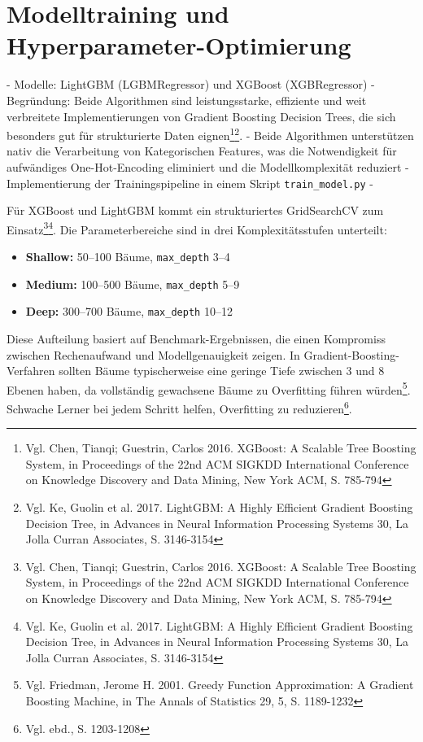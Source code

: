 \section{Modelltraining und Hyperparameter-Optimierung}

- Modelle: LightGBM (LGBMRegressor) und XGBoost (XGBRegressor)
- Begründung: Beide Algorithmen sind leistungsstarke, effiziente und weit verbreitete Implementierungen von Gradient Boosting Decision Trees, die sich besonders gut für strukturierte Daten eignen\footnote{Vgl. Chen, Tianqi; Guestrin, Carlos 2016. XGBoost: A Scalable Tree Boosting System, in Proceedings of the 22nd ACM SIGKDD International Conference on Knowledge Discovery and Data Mining, New York ACM, S. 785-794}\footnote{Vgl. Ke, Guolin et al. 2017. LightGBM: A Highly Efficient Gradient Boosting Decision Tree, in Advances in Neural Information Processing Systems 30, La Jolla Curran Associates, S. 3146-3154}.
- Beide Algorithmen unterstützen nativ die Verarbeitung von Kategorischen Features, was die Notwendigkeit für aufwändiges One-Hot-Encoding eliminiert und die Modellkomplexität reduziert
- Implementierung der Trainingspipeline in einem Skript \texttt{train\_model.py}
- 


Für XGBoost und LightGBM kommt ein strukturiertes GridSearchCV zum Einsatz\footnote{Vgl. Chen, Tianqi; Guestrin, Carlos 2016. XGBoost: A Scalable Tree Boosting System, in Proceedings of the 22nd ACM SIGKDD International Conference on Knowledge Discovery and Data Mining, New York ACM, S. 785-794}\footnote{Vgl. Ke, Guolin et al. 2017. LightGBM: A Highly Efficient Gradient Boosting Decision Tree, in Advances in Neural Information Processing Systems 30, La Jolla Curran Associates, S. 3146-3154}. Die Parameterbereiche sind in drei Komplexitätsstufen unterteilt:

\begin{itemize}
  \item \textbf{Shallow:} 50–100 Bäume, \texttt{max\_depth} 3–4
  \item \textbf{Medium:} 100–500 Bäume, \texttt{max\_depth} 5–9
  \item \textbf{Deep:} 300–700 Bäume, \texttt{max\_depth} 10–12
\end{itemize}

Diese Aufteilung basiert auf Benchmark-Ergebnissen, die einen Kompromiss zwischen Rechenaufwand und Modellgenauigkeit zeigen. In Gradient-Boosting-Verfahren sollten Bäume typischerweise eine geringe Tiefe zwischen 3 und 8 Ebenen haben, da vollständig gewachsene Bäume zu Overfitting führen würden\footnote{Vgl. Friedman, Jerome H. 2001. Greedy Function Approximation: A Gradient Boosting Machine, in The Annals of Statistics 29, 5, S. 1189-1232}. Schwache Lerner bei jedem Schritt helfen, Overfitting zu reduzieren\footnote{Vgl. ebd., S. 1203-1208}.

